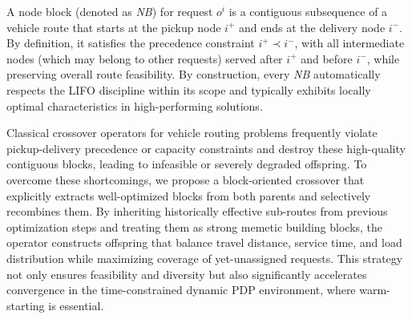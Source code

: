 \documentclass[preprint,12pt]{elsarticle}
\begin{document}


    
    
    




A node block (denoted as \textit{NB}) for request \(o^i\) is a contiguous subsequence of a vehicle route that starts at the pickup node \(i^+\) and ends at the delivery node \(i^-\). By definition, it satisfies the precedence constraint \(i^+ \prec i^-\), with all intermediate nodes (which may belong to other requests) served after \(i^+\) and before \(i^-\), while preserving overall route feasibility. By construction, every \textit{NB} automatically respects the LIFO discipline within its scope and typically exhibits locally optimal characteristics in high-performing solutions.

Classical crossover operators for vehicle routing problems frequently violate pickup-delivery precedence or capacity constraints and destroy these high-quality contiguous blocks, leading to infeasible or severely degraded offspring. To overcome these shortcomings, we propose a block-oriented crossover that explicitly extracts well-optimized blocks from both parents and selectively recombines them. By inheriting historically effective sub-routes from previous optimization steps and treating them as strong memetic building blocks, the operator constructs offspring that balance travel distance, service time, and load distribution while maximizing coverage of yet-unassigned requests. This strategy not only ensures feasibility and diversity but also significantly accelerates convergence in the time-constrained dynamic PDP environment, where warm-starting is essential. %
\end{document}
